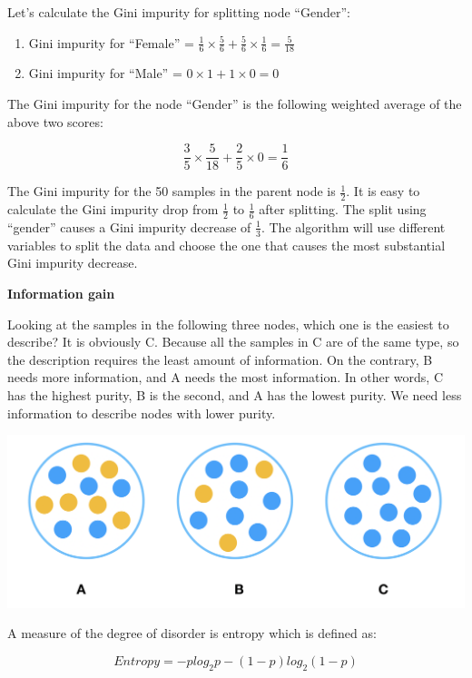 \documentclass[12pt,]{krantz}
\providecommand{\tightlist}{%
  \setlength{\itemsep}{0pt}\setlength{\parskip}{0pt}}
\begin{document}
Let's calculate the Gini impurity for splitting node ``Gender'':

\begin{enumerate}
\def\labelenumi{\arabic{enumi}.}
\tightlist
\item
  Gini impurity for ``Female'' = \(\frac{1}{6}\times\frac{5}{6}+\frac{5}{6}\times\frac{1}{6}=\frac{5}{18}\)
\item
  Gini impurity for ``Male'' = \(0\times1+1\times 0=0\)
\end{enumerate}

The Gini impurity for the node ``Gender'' is the following weighted average of the above two scores:

\[\frac{3}{5}\times\frac{5}{18}+\frac{2}{5}\times 0=\frac{1}{6}\]

The Gini impurity for the 50 samples in the parent node is \(\frac{1}{2}\). It is easy to calculate the Gini impurity drop from \(\frac{1}{2}\) to \(\frac{1}{6}\) after splitting. The split using ``gender'' causes a Gini impurity decrease of \(\frac{1}{3}\). The algorithm will use different variables to split the data and choose the one that causes the most substantial Gini impurity decrease.

\textbf{Information gain}

Looking at the samples in the following three nodes, which one is the easiest to describe? It is obviously C. Because all the samples in C are of the same type, so the description requires the least amount of information. On the contrary, B needs more information, and A needs the most information. In other words, C has the highest purity, B is the second, and A has the lowest purity. We need less information to describe nodes with lower purity.

\includegraphics{../linhui.org/book/Figure/InfoGainEN.PNG}

A measure of the degree of disorder is entropy which is defined as:

\[Entropy=-plog_{2}p-(1-p)log_{2}(1-p)\]
\end{document}
